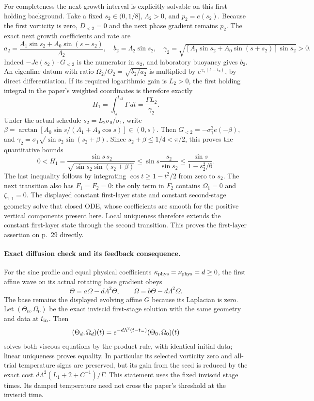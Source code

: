 \documentclass[11pt]{article}
\begin{document}
For completeness the next growth interval is explicitly solvable on
this first holding background. Take a fixed $s_2\in(0,1/8]$,
$\Lambda _2>0$, and $p_2=e(s_2)$. Because the first vorticity is zero,
$D_{<2}=0$ and the next phase gradient remains $p_2$. The exact next
growth coefficients and rate are
\[
 a_2=\frac{A_1\sin s_2+A_0\sin(s+s_2)}{\Lambda _2},\quad
 b_2=\Lambda _2\sin s_2,\quad
 \gamma _2=\sqrt{[A_1\sin s_2+A_0\sin(s+s_2)]\sin s_2}>0.
\]
Indeed $-Je(s_2)\cdot G_{<2}$ is the numerator in $a_2$, and
laboratory buoyancy gives $b_2$. An eigenline datum with ratio
$\Omega_2/\Theta_2=\sqrt{b_2/a_2}$ is multiplied by
$e^{\gamma _2(t-t_b)}$, by direct differentiation. If its required
logarithmic gain is $L_2>0$, the first holding integral in the paper's
weighted coordinates is therefore exactly
\[
 H_1=\int_{t_b}^{t_{a2}}\Gamma\,dt=\frac{\Gamma L_2}{\gamma _2}.
\]
Under the actual schedule $s_2=L_2\sigma _0/\sigma _1$, write
$\beta=\arctan[A_0\sin s/(A_1+A_0\cos s)]\in(0,s)$.
Then $G_{<2}=-\sigma _1^2e(-\beta)$, and
$\gamma _2=\sigma _1\sqrt{\sin s_2\sin(s_2+\beta)}$.
Since $s_2+\beta\leq1/4<\pi/2$, this proves the quantitative bounds
\[
 0<H_1=\frac{\sin s\,s_2}
 {\sqrt{\sin s_2\sin(s_2+\beta)}}
 \leq\sin s\frac{s_2}{\sin s_2}
 \leq\frac{\sin s}{1-s_2^2/6}.
\]
The last inequality follows by integrating
$\cos t\geq1-t^2/2$ from zero to $s_2$.
The next transition also has $F_1=F_2=0$: the only term in $F_2$
contains $\Omega_1=0$ and $\zeta_{1,1}=0$.
The displayed constant first-layer state and constant second-stage
geometry solve that closed ODE, whose coefficients are smooth for the
positive vertical components present here. Local uniqueness therefore
extends the constant first-layer state through the second transition.
This proves the first-layer assertion on p.~29 directly.

\paragraph{Exact diffusion check and its feedback consequence.}
For the sine profile and equal physical coefficients
$\kappa_{\rm phys}=\nu_{\rm phys}=d\geq0$, the first affine wave
on its actual rotating base gradient obeys
\[
 \dot\Theta=a\Omega-d\Lambda^2\Theta,\qquad
 \dot\Omega=b\Theta-d\Lambda^2\Omega.
\]
The base remains the displayed evolving affine $G$ because its
Laplacian is zero. Let $(\Theta_0,\Omega_0)$ be the exact inviscid
first-stage solution with the same geometry and data at $t_{\rm in}$.
Then
\[
 (\Theta_d,\Omega_d)(t)
 =e^{-d\Lambda^2(t-t_{\rm in})}(\Theta_0,\Omega_0)(t)
\]
solves both viscous equations by the product rule, with identical
initial data; linear uniqueness proves equality. In particular its
selected vorticity zero and all-trial temperature signs are preserved,
but its gain from the seed is reduced by the exact cost
$d\Lambda^2(L_1+2+C^{-1})/\Gamma$.
This statement uses the fixed inviscid stage times. Its damped
temperature need not cross the paper's threshold at the inviscid time.
\end{document}
